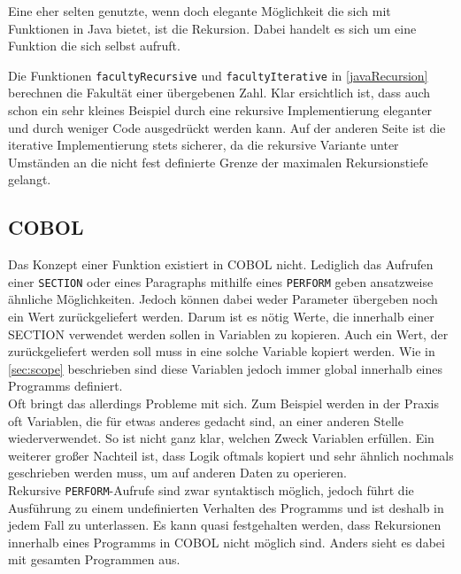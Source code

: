 Eine eher selten genutzte, wenn doch elegante Möglichkeit die sich mit Funktionen in Java bietet, ist die Rekursion. Dabei handelt es sich um eine Funktion die sich selbst aufruft. \\


Die Funktionen \texttt{facultyRecursive} und \texttt{facultyIterative} in \autoref{javaRecursion} berechnen  die Fakultät einer übergebenen Zahl. Klar ersichtlich ist, dass auch schon ein sehr kleines Beispiel durch eine rekursive Implementierung eleganter und durch weniger Code ausgedrückt werden kann. Auf der anderen Seite ist die iterative Implementierung stets sicherer, da die rekursive Variante unter Umständen an die nicht fest definierte Grenze der maximalen Rekursionstiefe gelangt.\\

\subsection*{COBOL}
Das Konzept einer Funktion existiert in COBOL nicht. Lediglich das Aufrufen einer \texttt{SECTION} oder eines Paragraphs mithilfe eines \texttt{PERFORM} geben ansatzweise ähnliche Möglichkeiten. Jedoch können dabei weder Parameter übergeben noch ein Wert zurückgeliefert werden. Darum ist es nötig Werte, die innerhalb einer SECTION verwendet werden sollen in Variablen zu kopieren. Auch ein Wert, der zurückgeliefert werden soll muss in eine solche Variable kopiert werden. Wie in \autoref{sec:scope} beschrieben sind diese Variablen jedoch immer global innerhalb eines Programms definiert.\\

Oft bringt das allerdings Probleme mit sich. Zum Beispiel werden in der Praxis oft Variablen, die für etwas anderes gedacht sind, an einer anderen Stelle wiederverwendet. So ist nicht ganz klar, welchen Zweck Variablen erfüllen. Ein weiterer großer Nachteil ist, dass Logik oftmals kopiert und sehr ähnlich nochmals geschrieben werden muss, um auf anderen Daten zu operieren.\\

Rekursive \texttt{PERFORM}-Aufrufe sind zwar syntaktisch möglich, jedoch führt die Ausführung zu einem undefinierten Verhalten des Programms und ist deshalb in jedem Fall zu unterlassen. Es kann quasi festgehalten werden, dass Rekursionen innerhalb eines Programms in COBOL nicht möglich sind. Anders sieht es dabei mit gesamten Programmen aus.

